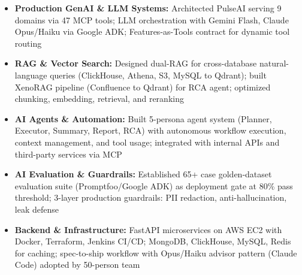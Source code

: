 \documentclass[]{cover}
\begin{document}


\currentdate{\today}



{\raggedright{}\fontsize{11pt}{13pt}\selectfont
\begin{itemize}
    \item \textbf{Production GenAI \& LLM Systems:} Architected PulseAI serving 9 domains via 47 MCP tools; LLM orchestration with Gemini Flash, Claude Opus/Haiku via Google ADK; Features-as-Tools contract for dynamic tool routing
    \item \textbf{RAG \& Vector Search:} Designed dual-RAG for cross-database natural-language queries (ClickHouse, Athena, S3, MySQL to Qdrant); built XenoRAG pipeline (Confluence to Qdrant) for RCA agent; optimized chunking, embedding, retrieval, and reranking
    \item \textbf{AI Agents \& Automation:} Built 5-persona agent system (Planner, Executor, Summary, Report, RCA) with autonomous workflow execution, context management, and tool usage; integrated with internal APIs and third-party services via MCP
    \item \textbf{AI Evaluation \& Guardrails:} Established 65+ case golden-dataset evaluation suite (Promptfoo/Google ADK) as deployment gate at 80\% pass threshold; 3-layer production guardrails: PII redaction, anti-hallucination, leak defense
    \item \textbf{Backend \& Infrastructure:} FastAPI microservices on AWS EC2 with Docker, Terraform, Jenkins CI/CD; MongoDB, ClickHouse, MySQL, Redis for caching; spec-to-ship workflow with Opus/Haiku advisor pattern (Claude Code) adopted by 50-person team
\end{itemize}\par}
\vspace{6pt}
\end{document}
